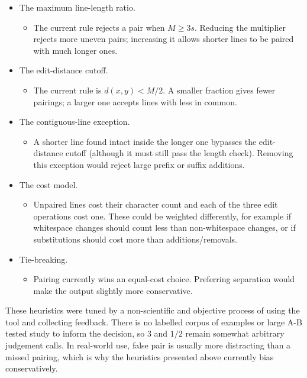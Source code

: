 \documentclass[
]{article}
\providecommand{\tightlist}{%
  \setlength{\itemsep}{0pt}\setlength{\parskip}{0pt}}
\begin{document}
\begin{itemize}
\tightlist
\item
  The maximum line-length ratio.

  \begin{itemize}
  \tightlist
  \item
    The current rule rejects a pair when \(M\geq3s\). Reducing the
    multiplier rejects more uneven pairs; increasing it allows shorter
    lines to be paired with much longer ones.
  \end{itemize}
\item
  The edit-distance cutoff.

  \begin{itemize}
  \tightlist
  \item
    The current rule is \(d(x,y)<M/2\). A smaller fraction gives fewer
    pairings; a larger one accepts lines with less in common.
  \end{itemize}
\item
  The contiguous-line exception.

  \begin{itemize}
  \tightlist
  \item
    A shorter line found intact inside the longer one bypasses the
    edit-distance cutoff (although it must still pass the length check).
    Removing this exception would reject large prefix or suffix
    additions.
  \end{itemize}
\item
  The cost model.

  \begin{itemize}
  \tightlist
  \item
    Unpaired lines cost their character count and each of the three edit
    operations cost one. These could be weighted differently, for
    example if whitespace changes should count less than non-whitespace
    changes, or if substitutions should cost more than
    additions/removals.
  \end{itemize}
\item
  Tie-breaking.

  \begin{itemize}
  \tightlist
  \item
    Pairing currently wins an equal-cost choice. Preferring separation
    would make the output slightly more conservative.
  \end{itemize}
\end{itemize}

These heuristics were tuned by a non-scientific and objective process of
using the tool and collecting feedback. There is no labelled corpus of
examples or large A-B tested study to inform the decision, so \(3\) and
\(1/2\) remain somewhat arbitrary judgement calls. In real-world use,
false pair is usually more distracting than a missed pairing, which is
why the heuristics presented above currently bias conservatively.
\end{document}
